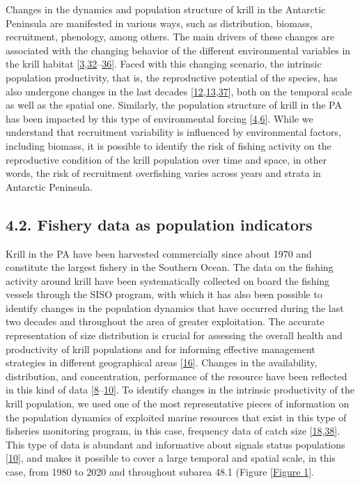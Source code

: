 \documentclass[
]{article}
\begin{document}
Changes in the dynamics and population structure of krill in the
Antarctic Peninsula are manifested in various ways, such as
distribution, biomass, recruitment, phenology, among others. The main
drivers of these changes are associated with the changing behavior of
the different environmental variables in the krill habitat
{[}\protect\hyperlink{ref-Saba2014}{3},\protect\hyperlink{ref-Flores2012a}{32}--\protect\hyperlink{ref-Walsh2020}{36}{]}.
Faced with this changing scenario, the intrinsic population
productivity, that is, the reproductive potential of the species, has
also undergone changes in the last decades
{[}\protect\hyperlink{ref-McBride2021}{12},\protect\hyperlink{ref-Atkinson2022}{13},\protect\hyperlink{ref-Perry2020}{37}{]},
both on the temporal scale as well as the spatial one. Similarly, the
population structure of krill in the PA has been impacted by this type
of environmental forcing
{[}\protect\hyperlink{ref-Siegel2013}{4},\protect\hyperlink{ref-Reiss2020}{6}{]}.
While we understand that recruitment variability is influenced by
environmental factors, including biomass, it is possible to identify the
risk of fishing activity on the reproductive condition of the krill
population over time and space, in other words, the risk of recruitment
overfishing varies across years and strata in Antarctic Peninsula.

\hypertarget{fishery-data-as-population-indicators}{%
\subsection{4.2. Fishery data as population
indicators}\label{fishery-data-as-population-indicators}}

Krill in the PA have been harvested commercially since about 1970 and
constitute the largest fishery in the Southern Ocean. The data on the
fishing activity around krill have been systematically collected on
board the fishing vessels through the SISO program, with which it has
also been possible to identify changes in the population dynamics that
have occurred during the last two decades and throughout the area of
greater exploitation. The accurate representation of size distribution
is crucial for assessing the overall health and productivity of krill
populations and for informing effective management strategies in
different geographical areas
{[}\protect\hyperlink{ref-Thanassekos2014}{16}{]}. Changes in the
availability, distribution, and concentration, performance of the
resource have been reflected in this kind of data
{[}\protect\hyperlink{ref-Froese2018}{8}--\protect\hyperlink{ref-Canales2021}{10}{]}.
To identify changes in the intrinsic productivity of the krill
population, we used one of the most representative pieces of information
on the population dynamics of exploited marine resources that exist in
this type of fisheries monitoring program, in this case, frequency data
of catch size
{[}\protect\hyperlink{ref-Prince2018}{18},\protect\hyperlink{ref-Chong2019}{38}{]}.
This type of data is abundant and informative about signals status
populations {[}\protect\hyperlink{ref-Canales2021}{10}{]}, and makes it
possible to cover a large temporal and spatial scale, in this case, from
1980 to 2020 and throughout subarea 48.1 (Figure \ref{Figure 1}.
\end{document}
